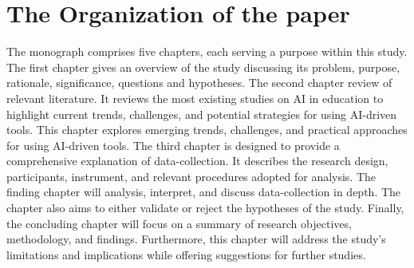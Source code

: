 

\section{The Organization of the paper}\label{sec:the-organization-of-the-paper}
\justifying
The monograph comprises five chapters, each serving a purpose within this study.
The first chapter gives an overview of the study discussing its problem,
purpose, rationale, significance, questions and hypotheses.
The second chapter review of relevant literature.
It reviews the most existing studies on AI in education to highlight current
trends, challenges, and potential strategies for using AI-driven tools.
This chapter explores emerging trends, challenges, and practical approaches for using AI-driven tools.
The third chapter is designed to provide a comprehensive explanation of data-collection.
It describes the research design, participants, instrument, and relevant procedures
adopted for analysis.
The finding chapter will analysis, interpret, and discuss data-collection in depth.
The chapter also aims to either validate or reject the hypotheses of the study.
Finally, the concluding chapter will focus on a summary of research objectives, methodology, and findings.
Furthermore,
this chapter will address the study's limitations and implications while offering suggestions for further studies.
